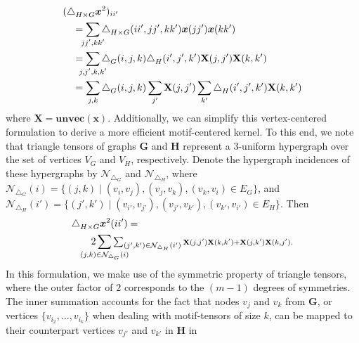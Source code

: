 \documentclass[10pt, journal, compsoc, final]{IEEEtran}
\newcommand{\bs}[1]{\boldsymbol{#1}}
\newcommand{\Vector}[1]{\bs{#1}}
\newcommand{\Matrix}[1]{\mathbf{#1}}
\newcommand{\Tensor}[1]{\mathbf{\mathcal{#1}}}
\newcommand{\Graph}[1]{\mathit{\mathbf{\bs{#1}}}}
\newcommand{\Set}[1]{\mathit{#1}}
\newcommand{\Hyperset}[1]{\mathcal{#1}}
\newcommand{\where}{\mid}
\begin{document}
\begin{equation}
\begin{aligned}
& (\Tensor{\bigtriangleup}_{H \times G}\Vector{x}^2)_{ii'} \\
& \quad = \sum_{\mathclap{jj', kk'}} \Tensor{\bigtriangleup}_{H \times G} (ii', jj', kk') \Vector{x}(jj')\Vector{x}(kk') \\
& \quad = \sum_{\mathclap{j, j', k, k'}} \Tensor{\bigtriangleup}_G(i, j, k)\Tensor{\bigtriangleup}_H(i', j', k') \Matrix{X}(j, j')\Matrix{X}(k, k')\\ 
& \quad = \sum_{\mathclap{j, k}} \Tensor{\bigtriangleup}_G(i, j, k)\sum_{j'} \Matrix{X}(j, j')\sum_{k'}\Tensor{\bigtriangleup}_H(i', j', k') \Matrix{X}(k, k')
\label{eq:impKernel_vectex}
\end{aligned}
\end{equation}
where $\Matrix{X} = \textbf{unvec}(\Vector{x})$. Additionally, we can simplify this 
vertex-centered formulation to derive a more efficient motif-centered kernel. To this end, we note 
that triangle tensors of graphs $\Graph{G}$ and $\Graph{H}$ represent a 3-uniform hypergraph over 
the set of vertices $V_G$ and $V_H$, respectively. Denote the hypergraph incidences of 
these hypergraphs by $\Hyperset{N}_{\bigtriangleup_G}$ and $\Hyperset{N}_{\bigtriangleup_H}$, 
where $\Hyperset{N}_{\bigtriangleup_G}(i) = \{(j, k) \where (v_i, v_j), (v_j, v_k), (v_k, v_i) \in 
\Set{E}_G\}$, and $\Hyperset{N}_{\bigtriangleup_H}(i') = \{(j', k') \where (v_{i'}, v_{j'}), (v_{j'}, v_{k'}), 
(v_{k'}, v_{i'}) \in \Set{E}_H\}$. Then
\begin{equation}
 \label{eq:impKernel_motif}
\begin{aligned}
 & \Tensor{\bigtriangleup}_{H \times G}\Vector{x}^2(ii') = \\ & \qquad 2 \sum_{\mathclap{(j, k) \in \Hyperset{N}_{\bigtriangleup_G}(i)}} 
  \textstyle \sum_{(j', k') \in \Hyperset{N}_{\bigtriangleup_H}(i')} \scriptstyle \Matrix{X}(j, j')\Matrix{X}(k, k') + \Matrix{X}(j, k')\Matrix{X}(k, j').\\
\end{aligned}
\end{equation}
In this formulation, we make use of the symmetric property of triangle tensors, where the outer 
factor of $2$ corresponds to the $(m-1)$ degrees of symmetries. The inner summation accounts for the fact that nodes $v_j$ and $v_k$ from $\Graph{G}$, or vertices $\{ v_{i_2},\ldots, v_{i_k} \}$ when dealing with motif-tensors of 
size $k$, can be mapped to their counterpart vertices $v_{j'}$ and $v_{k'}$ in $\Graph{H}$ in 
\end{document}
